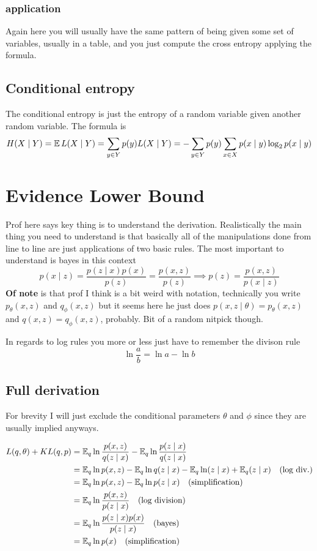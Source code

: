 \documentclass[12pt]{article}
\begin{document}
\subsubsection*{application}
Again here you will usually have the same pattern of being given some set of variables, usually in a table, and you just compute the cross entropy applying the formula.

\subsection{Conditional entropy}
The conditional entropy is just the entropy of a random variable given another random variable. The formula is
\[
    H(X\mid Y) = \operatorname{\mathbb{E}}{L(X\mid Y)} = \sum_{y\in Y}p(y)L(X\mid Y) = -\sum_{y\in Y}p(y)\sum_{x\in X}p(x\mid y)\log_2 p(x\mid y)  
\]

\section{Evidence Lower Bound}
Prof here says key thing is to understand the derivation. Realistically the main thing you need to understand is that basically all of the manipulations done from line to line are just applications of two basic rules. The most important to understand is bayes in this context
\[
    p(x\mid z) = \frac{p(z\mid x)p(x)}{p(z)} = \frac{p(x, z)}{p(z)}\implies p(z) = \frac{p(x, z)}{p(x\mid z)}
\]
\textbf{Of note} is that prof I think is a bit weird with notation, technically you write $p_\theta(x, z)$ and $q_\phi(x, z)$ but it seems here he just does $p(x, z\mid \theta) = p_\theta(x, z)$ and $q(x, z) = q_\phi(x, z)$, probably. Bit of a random nitpick though.  

In regards to log rules you more or less just have to remember the divison rule
\[
    \ln \frac{a}{b} = \ln a - \ln b    
\]
\subsection{Full derivation}

For brevity I will just exclude the conditional parameters $\theta$ and $\phi$ since they are usually implied anyways. 


\begin{align}
    L(q, \theta) + KL(q, p) &= \operatorname{\mathbb{E}}_q\ln \frac{p(x, z)}{q(z\mid x)} - \operatorname{\mathbb{E}}_q \ln \frac{p(z\mid x)}{q(z\mid x)} \\
    &= \operatorname{\mathbb{E}}_q \ln p(x, z) - \operatorname{\mathbb{E}}_q \ln q(z\mid x) - \operatorname{\mathbb{E}}_q \ln (z\mid x) + \operatorname{\mathbb{E}}_q(z\mid x) \quad (\text{log div.}) \\
    &= \operatorname{\mathbb{E}}_q \ln p(x, z) - \operatorname{\mathbb{E}}_q \ln p(z\mid x)\quad (\text{simplification}) \\
    &= \operatorname{\mathbb{E}}_q \ln \frac{p(x, z)}{p(z\mid x)} \quad (\text{log division})\\
    &= \operatorname{\mathbb{E}}_q \ln \frac{p(z\mid x)p(x)}{p(z\mid x)} \quad (\text{bayes}) \\
    &= \operatorname{\mathbb{E}}_q \ln p(x) \quad (\text{simplification})\\
\end{align}
\end{document}

